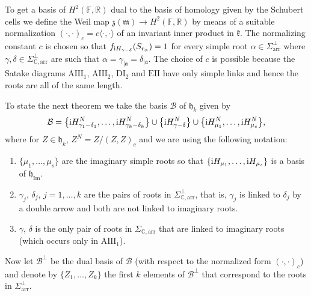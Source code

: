 \documentclass[10pt,a4paper]{amsart}
\numberwithin{equation}{section}
\newcommand{\func}[1]{\operatorname{#1}}
\begin{document}
To get a basis of $H^{2}(\mathbb{F},\mathbb{R}) $ dual to the basis of homology given by the Schubert cells we define the Weil map $\mathfrak{z}(\mathfrak{m}) \rightarrow H^{2}( \mathbb{F},\mathbb{R}) $ by means of a suitable normalization $ ( \cdot,\cdot ) _{c}=c\langle \cdot,\cdot \rangle $ of an invariant inner product in $\mathfrak{k}$. The normalizing constant $c$ is chosen so that $f_{{\rm i}H_{\gamma -\delta }} ( S_{r_{\alpha }} ) =1$ for every simple root $\alpha \in \Sigma _{\mathrm{arr}}^{\bot }$ where $\gamma,\delta \in \Sigma _{\mathbb{C},\mathrm{arr}}^{\bot }$ are such that $\alpha =\gamma _{\vert \mathfrak{a} }=\delta _{\vert \mathfrak{a}}$. The choice of $c$ is possible because the Satake diagrams $\mathrm{AIII}_{1}$, $\mathrm{AIII}_{2}$, $\mathrm{DI}_{2}$ and $\mathrm{EII}$ have only simple links and hence the roots are all of the same length.

To state the next theorem we take the basis $\mathcal{B}$ of $\mathfrak{h}_{k}$ given by
\begin{gather*}
\mathcal{B}=\big\{{\rm i}H_{\gamma _{1}-\delta _{1}}^{N},\ldots,{\rm i}H_{\gamma _{k}-\delta _{k}}^{N}\big\}\cup \big\{{\rm i}H_{\gamma -\delta }^{N}\big\}\cup \big\{{\rm i}H_{\mu_{1}}^{N},\ldots,{\rm i}H_{\mu _{s}}^{N}\big\},
\end{gather*}
where for $Z\in \mathfrak{h}_{k}$, $Z^{N}=Z/(Z,Z) _{c}$ and we are using the following notation:
\begin{enumerate}\itemsep=0pt
\item $\{\mu _{1},\ldots,\mu _{s}\}$ are the imaginary simple roots so that $\{{\rm i}H_{\mu _{1}},\ldots,{\rm i}H_{\mu _{s}}\}$ is a basis of $\mathfrak{h}_{\func{Im}}$.

\item $\gamma _{j}$, $\delta _{j}$, $j=1,\ldots,k$ are the pairs of roots in $\Sigma _{\mathbb{C},\mathrm{arr}}^{\bot }$, that is, $\gamma _{j}$ is linked to $\delta _{j}$ by a double arrow and both are not linked to imaginary
roots.

\item $\gamma$, $\delta $ is the only pair of roots in $\Sigma _{\mathbb{C},\mathrm{arr}}$ that are linked to imaginary roots (which occurs only in $\mathrm{AIII}_{1}$).
\end{enumerate}

Now let $\mathcal{B}^{\bot }$ be the dual basis of $\mathcal{B}$ (with
respect to the normalized form $(\cdot,\cdot) _{c}$) and
denote by $\{Z_{1},\ldots,Z_{k}\}$ the first $k$ elements of $\mathcal{B}%
^{\bot }$ that correspond to the roots in $\Sigma _{\mathrm{arr}}^{\bot }$.
\end{document}
